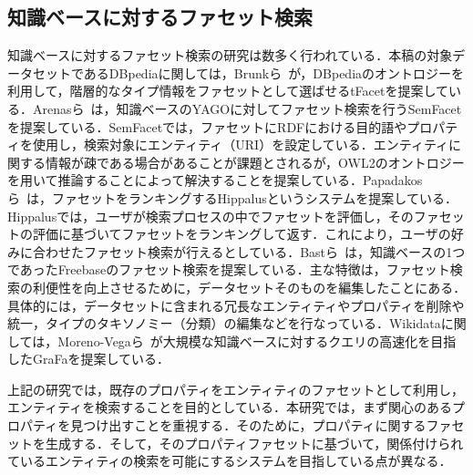 \subsection{知識ベースに対するファセット検索}
知識ベースに対するファセット検索の研究は数多く行われている．本稿の対象データセットであるDBpediaに関しては，Brunkら~\cite{Brunk2011tFacetHF}が，DBpediaのオントロジーを利用して，階層的なタイプ情報をファセットとして選ばせるtFacetを提案している．Arenasら~\cite{Arenas:2014:SSF:2567948.2577011}は，知識ベースのYAGOに対してファセット検索を行うSemFacetを提案している．SemFacetでは，ファセットにRDFにおける目的語やプロパティを使用し，検索対象にエンティティ（URI）を設定している．エンティティに関する情報が疎である場合があることが課題とされるが，OWL2のオントロジーを用いて推論することによって解決することを提案している．Papadakosら~\cite{Papadakos2014HippalusPF}は，ファセットをランキングするHippalusというシステムを提案している．Hippalusでは，ユーザが検索プロセスの中でファセットを評価し，そのファセットの評価に基づいてファセットをランキングして返す．これにより，ユーザの好みに合わせたファセット検索が行えるとしている．Bastら~\cite{Bast:2014:EAF:2567948.2577016}は，知識ベースの1つであったFreebaseのファセット検索を提案している．主な特徴は，ファセット検索の利便性を向上させるために，データセットそのものを編集したことにある．具体的には，データセットに含まれる冗長なエンティティやプロパティを削除や統一，タイプのタキソノミー（分類）の編集などを行なっている．Wikidataに関しては，Moreno-Vegaら~\cite{10.1007/978-3-030-00671-6_18}が大規模な知識ベースに対するクエリの高速化を目指したGraFaを提案している．

上記の研究では，既存のプロパティをエンティティのファセットとして利用し，エンティティを検索することを目的としている．本研究では，まず関心のあるプロパティを見つけ出すことを重視する．そのために，プロパティに関するファセットを生成する．そして，そのプロパティファセットに基づいて，関係付けられているエンティティの検索を可能にするシステムを目指している点が異なる．